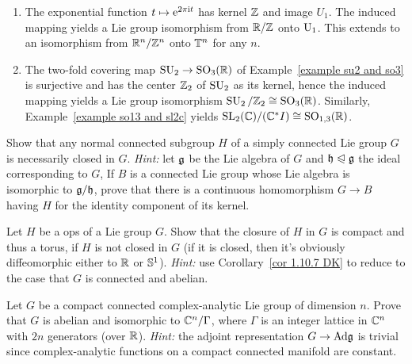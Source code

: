 \begin{example}
    \begin{enumerate}
        \item The exponential function $t\mapsto \mathrm{e}^{2\pi\mathrm{i} t}$ has kernel $\mathbb{Z}$ and image $U_1$. The induced mapping yields a Lie group isomorphism from $\mathbb{R}\slash \mathbb{Z}$ onto $\operatorname{U}_1$. This extends to an isomorphism from $\mathbb{R}^n\slash\mathbb{Z}^n$ onto $\mathbb{T}^n$ for any $n$.
        \item The two-fold covering map $\operatorname{SU}_2\to \operatorname{SO}_3(\mathbb{R})$ of Example~\ref{example su2 and so3} is surjective and has the center $\mathbb{Z}_2$ of $\operatorname{SU}_2$ as its kernel, hence the induced mapping yields a Lie group isomorphism $\operatorname{SU}_2\slash\mathbb{Z}_2\cong \operatorname{SO}_3(\mathbb{R})$. Similarly, Example~\ref{example so13 and sl2c} yields $\operatorname{SL}_2(\mathbb{C})\slash (\mathbb{C}^\ast I)\cong \operatorname{SO}_{1,3}(\mathbb{R})$.
    \end{enumerate}
\end{example}



\begin{xca}
    Show that any normal connected subgroup $H$ of a simply connected Lie group $G$ is necessarily closed in $G$. \emph{Hint:} let $\mathfrak{g}$ be the Lie algebra of $G$ and $\mathfrak{h}\trianglelefteqslant\mathfrak{g}$ the ideal corresponding to $G$, If $B$ is a connected Lie group whose Lie algebra is isomorphic to $\mathfrak{g}\slash\mathfrak{h}$, prove that there is a continuous homomorphism $G\to B$ having $H$ for the identity component of its kernel.
\end{xca}

\begin{xca}
    Let $H$ be a \gls{ops} of a Lie group $G$. Show that the closure of $H$ in $G$ is compact and thus a torus, if $H$ is not closed in $G$ (if it is closed, then it's obviously diffeomorphic either to $\mathbb{R}$ or $\mathbb{S}^1$). \emph{Hint:} use Corollary~\ref{cor 1.10.7 DK} to reduce to the case that $G$ is connected and abelian.
\end{xca}

\begin{xca}
    Let $G$ be a compact connected complex-analytic Lie group of dimension $n$. Prove that $G$ is abelian and isomorphic to $\mathbb{C}^n\slash\Gamma$, where $\Gamma$ is an integer lattice in $\mathbb{C}^n$ with $2n$ generators (over $\mathbb{R}$). \emph{Hint:} the adjoint representation $G\to \mathrm{Ad}\mathfrak{g}$ is trivial since complex-analytic functions on a compact connected manifold are constant.
\end{xca}









